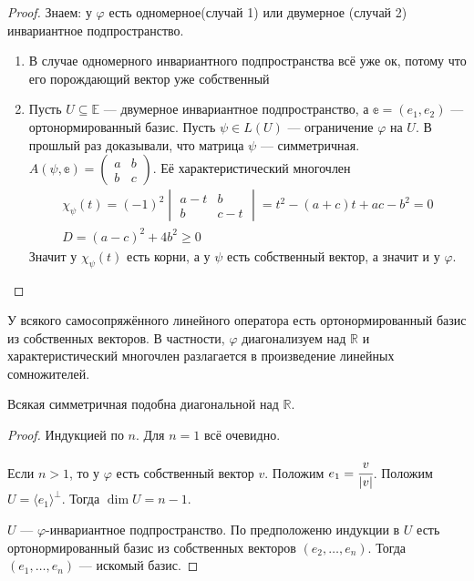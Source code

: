 \begin{proof}
	Знаем: у $\varphi$ есть одномерное(случай 1) или двумерное (случай 2) инвариантное подпространство.
	
\begin{enumerate}
	\item В случае одномерного инвариантного подпространства всё уже ок, потому что его порождающий вектор уже собственный
	
	\item Пусть $U \subseteq \mathbb{E}$ --- двумерное инвариантное подпространство, а $\mathbb{e} = (e_1, e_2)$ --- ортонормированный базис. Пусть $\psi \in L(U)$ --- ограничение $\varphi$ на $U$. В прошлый раз доказывали, что матрица $\psi$ --- симметричная. $A(\psi, \mathbb{e}) = \begin{pmatrix}
		a& b\\
		b& c
	\end{pmatrix}$.
	Её характеристический многочлен \begin{gather*}
	\chi_\psi(t) = (-1)^2\begin{vmatrix}
	a-t& b\\
	b& c-t
	\end{vmatrix} = t^2 - (a + c)t + ac - b^2 = 0\\
	D = (a - c)^2 + 4b^2 \geqslant 0
	\end{gather*}
	Значит у $\chi_\psi(t)$ есть корни, а у $\psi$ есть собственный вектор, а значит и у $\varphi$.
\end{enumerate}

\end{proof}

\begin{Theorem}
	У всякого самосопряжённого линейного оператора есть ортонормированный базис из собственных векторов. В частности, $\varphi$ диагонализуем над $\mathbb{R}$ и характеристический многочлен разлагается в произведение линейных сомножителей.
\end{Theorem}

\begin{Consequence}
	Всякая симметричная подобна диагональной над $\mathbb{R}$.
\end{Consequence}

\begin{proof}
	Индукцией по $n$. Для $n = 1$ всё очевидно.
	\par Если $n > 1$, то у $\varphi$ есть собственный вектор $v$. Положим $e_1 = \cfrac{v}{|v|}$. Положим $U = \langle e_1\rangle^\perp$. Тогда $\dim U = n - 1$.
	
	\par $U$ --- $\varphi$-инвариантное подпространство. По предположеню индукции в $U$ есть ортонормированный базис из собственных векторов $(e_2,\ldots, e_n)$. Тогда $(e_1,\ldots, e_n)$ --- искомый базис.
\end{proof}

